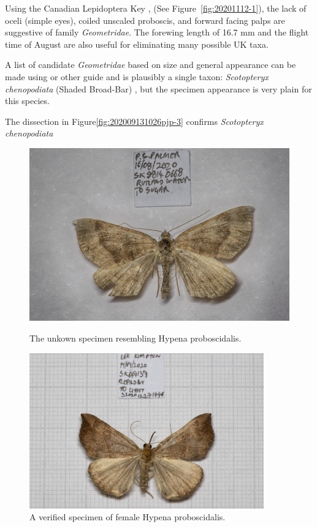 \documentclass[]{article}
\begin{document}
Using the Canadian Lepidoptera Key , (See Figure~\ref{fig:20201112-1}), the lack of oceli (simple eyes), coiled unscaled proboscis, and forward facing palps are suggestive of family \textit{Geometridae}. The forewing length of 16.7 mm and the flight time of August are also useful for eliminating many possible UK taxa.

A list of candidate \textit{Geometridae} based on size and general appearance can be made using  \citet{Skinner1984} or other guide and is plausibly a single taxon: \textit{Scotopteryx chenopodiata} (Shaded Broad-Bar) , but the specimen appearance is very plain for this species.

The dissection in Figure\ref{fig:202009131026pjp-3}  confirms \textit{Scotopteryx chenopodiata} 

\begin{figure}
	\centering
	\begin{minipage}{0.45\textwidth}
		\centering
	\includegraphics[width=0.9\linewidth]{202009131026PJP-1}
	\caption{The unkown specimen resembling Hypena proboscidalis.}
	\label{fig:202009131026pjp-1}
	\end{minipage}\hfill
	\begin{minipage}{0.45\textwidth}
		\centering
		\includegraphics[width=0.9\textwidth]{S202012271446-1} %
		\caption{A verified specimen of female Hypena proboscidalis.}
		\label{fig:S202012271446-1}
	\end{minipage}
\end{figure}
\end{document}
